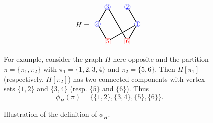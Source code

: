 \documentclass[12pt,a4paper,reqno]{amsart}
\theoremstyle{remark}
\begin{document}
\begin{figure}[ht]
    \hfill \begin{minipage}{.3\linewidth}
        \[H=\begin{array}{c}\begin{tikzpicture}
    \tikzstyle{vertex1}=[circle,blue!90!white,draw,inner sep=0.5pt,minimum size=1mm]
    \tikzstyle{vertex2}=[rectangle,red,draw,inner sep=1.5pt,minimum size=1mm]
    \node (v1) at (0:1) [vertex1] {\footnotesize $1$};
    \node (v2) at (60:1) [vertex1] {\footnotesize $2$};
    \node (v3) at (120:1) [vertex1] {\footnotesize $3$};
    \node (v4) at (180:1) [vertex1] {\footnotesize $4$};
    \node (v5) at (240:1) [vertex2] {\footnotesize $5$};
    \node (v6) at (300:1) [vertex2] {\footnotesize $6$};
    \draw [line width=1pt] (v1) to (v5);
    \draw [line width=1pt] (v1) to (v6);
    \draw [line width=1pt] (v2) to (v1);
    \draw [line width=1pt] (v3) to (v4);
    \draw [line width=1pt] (v3) to (v6);
    \draw [line width=1pt] (v5) to (v4);
\end{tikzpicture} \end{array}\]
    \end{minipage}\hfill \hfill
    \begin{minipage}{.6\linewidth}
For example, consider the graph $H$ here opposite and the partition $\pi=\{\pi_1,\pi_2\}$ with $\pi_1=\{1,2,3,4\}$ and $\pi_2=\{5,6\}$. Then $H[\pi_1]$ (respectively, $H[\pi_2]$) has two connected components with vertex sets $\{1,2\}$ and $\{3,4\}$ (resp. $\{5\}$ and $\{6\}$). Thus
\[\phi_H(\pi)=\{\{1,2\},\{3,4\},\{5\},\{6\}\}. \]
    \end{minipage} \hfill
    \vspace{3mm}
    \caption{Illustration of the definition of $\phi_H$.}
    \label{fig:phiH}
\end{figure}
\end{document}
